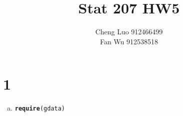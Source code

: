 \documentclass{article}\usepackage[]{graphicx}\usepackage[]{color}
\makeatletter
\newcommand{\hlstd}[1]{\textcolor[rgb]{0.345,0.345,0.345}{#1}}%
\newcommand{\hlkwd}[1]{\textcolor[rgb]{0.737,0.353,0.396}{\textbf{#1}}}%
\newenvironment{kframe}{%
 \def\at@end@of@kframe{}%
 \ifinner\ifhmode%
  \def\at@end@of@kframe{\end{minipage}}%
  \begin{minipage}{\columnwidth}%
 \fi\fi%
 \def\FrameCommand##1{\hskip\@totalleftmargin \hskip-\fboxsep
 \colorbox{shadecolor}{##1}\hskip-\fboxsep
     \hskip-\linewidth \hskip-\@totalleftmargin \hskip\columnwidth}%
 \MakeFramed {\advance\hsize-\width
   \@totalleftmargin\z@ \linewidth\hsize
   \@setminipage}}%
 {\par\unskip\endMakeFramed%
 \at@end@of@kframe}
\newenvironment{knitrout}{}{} %
\makeatother
\begin{document}
\title{\huge \textbf{Stat 207 HW5} \\}
\author{\large Cheng Luo 912466499 \\ \large Fan Wu 912538518}
\maketitle

\newpage
\mbox{}
\newpage

\section{1}

\begin{enumerate}[(a)]

\item

\begin{knitrout}
\color{fgcolor}\begin{kframe}
\begin{alltt}
  \hlkwd{require}\hlstd{(gdata)}
\end{alltt}



\end{kframe}
\end{knitrout}
\end{enumerate}
\end{document}
